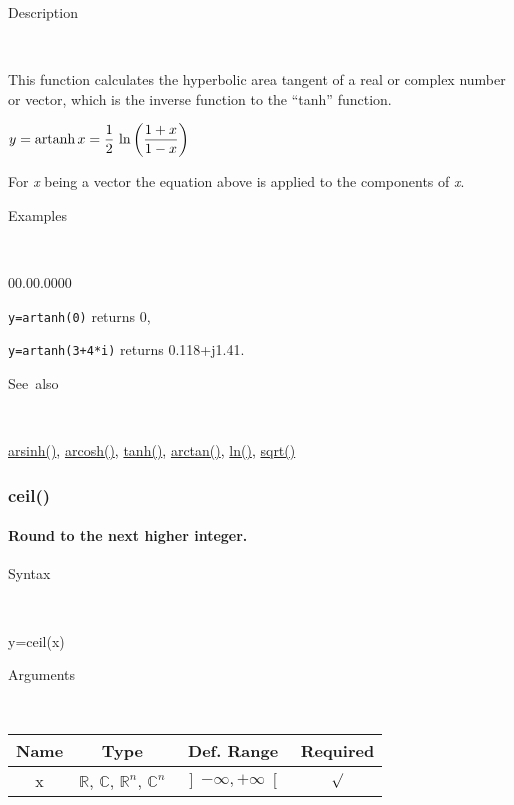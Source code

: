 \begin{description}
\item [Description]~
\end{description}
This function calculates the hyperbolic area tangent of a real or
complex number or vector, which is the inverse function to the {}``tanh''
function.

\medskip{}
$y=\textrm{artanh\,}x={\displaystyle \frac{1}{2}\,\ln\left(\frac{1+x}{1-x}\right)}$ 
\medskip{}

For \textit{x} being a vector the equation above is applied
to the components of \textit{x}.

\begin{description}
\item [Examples]~
\end{description}
\begin{lyxlist}{00.00.0000}
\item [\texttt{y=artanh(0)}]returns 0,
\item [\texttt{y=artanh(3+4{*}i)}]returns 0.118+j1.41.
\end{lyxlist}
\begin{description}
\item [See~also]~
\end{description}
\textcolor{blue}{\hyperlink{arsinh}{arsinh()}}\textcolor{black}{,}
\textcolor{blue}{\hyperlink{arcosh}{arcosh()}}\textcolor{black}{,}
\textcolor{blue}{\hyperlink{tanh}{tanh()}}\textcolor{black}{,} \textcolor{blue}{\hyperlink{arctan}{arctan()}}\textcolor{black}{,}
\textcolor{blue}{\hyperlink{ln}{ln()}}\textcolor{black}{,} \textcolor{blue}{\hyperlink{sqrt}{sqrt()}}


\newpage
{}


\subsubsection*{\hypertarget{ceil}{}{\Large ceil()}}


\paragraph{\label{par:ceil}Round to the next higher integer.}

\begin{description}
\item [Syntax]~
\end{description}
y=ceil(x)

\begin{description}
\item [Arguments]~
\end{description}
\begin{tabular}{|c|c|c|c|}
\hline 
Name&
Type&
Def. Range&
Required\tabularnewline
\hline
\hline 
x&
$\mathbb{R}$, $\mathbb{C}$, $\mathbb{R}^{n}$, $\mathbb{C}^{n}$&
$\left]-\infty,+\infty\right[$&
$\surd$\tabularnewline
\hline
\end{tabular}

